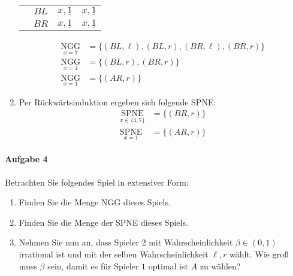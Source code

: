 \begin{enumerate}
\begin{center}
\begin{minipage}{0.30\textwidth}
\begin{tabular}{cccc}
          & $BL$ & $x,\underline{1}$ & $x,\underline{1}$\\
          & $BR$ & $x,\underline{1}$ & $x,\underline{1}$
        \end{tabular}
      \end{minipage}
    \end{center}
    \begin{align*}
      \underset{x=7}{\text{NGG}} & = \{(BL, \ell), (BL, r), (BR, \ell), (BR, r)\}\\
      \underset{x=4}{\text{NGG}} & = \{(BL, r), (BR, r)\}\\
      \underset{x=1}{\text{NGG}} & = \{(AR, r)\}
    \end{align*}

  \item Per Rückwärtsinduktion ergeben sich folgende SPNE:
    \begin{align*}
      \underset{x \in \{4,7\}}{\text{SPNE}} & = \{(BR, r)\}\\
      \underset{x=1}{\text{SPNE}} & = \{(AR, r)\}
    \end{align*}
\end{enumerate}


\paragraph{Aufgabe 4}%
\label{par:serie_6_aufgabe_4}

Betrachten Sie folgendes Spiel in extensiver Form:
\begin{center}
\end{center}

\begin{enumerate}
  \item Finden Sie die Menge NGG dieses Spiels.
  \item Finden Sie die Menge der SPNE dieses Spiels.
  \item Nehmen Sie nun an, dass Spieler 2 mit Wahrscheinlichkeit $\beta \in (0,1)$
    irrational ist und mit der selben Wahrscheinlichkeit $\ell, r$ wählt.
    Wie groß muss $\beta$ sein, damit es für Spieler $1$ optimal ist $A$ zu wählen?
\end{enumerate}

